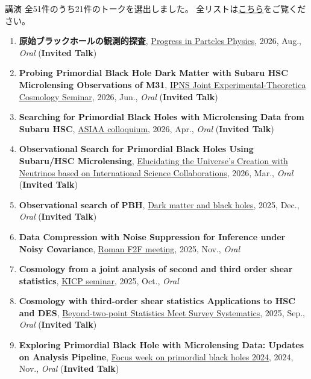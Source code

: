 \begin{rSection}{講演}
全51件のうち21件のトークを選出しました。
全リストは\href{https://github.com/git-sunao/cv/blob/main/ja/sunao_type_list.pdf}{こちら}をご覧ください。\begin{enumerate}[itemsep=0pt, parsep=0pt, topsep=0pt, partopsep=0pt]
\item \textbf{原始ブラックホールの観測的探査}, \href{https://indico.yukawa.kyoto-u.ac.jp/event/95/overview}{Progress in Partcles Physics}, 2026, Aug., \textit{Oral} (\textbf{Invited Talk})
\item \textbf{Probing Primordial Black Hole Dark Matter with Subaru HSC Microlensing Observations of M31}, \href{https://cosmophysics.gitlab.io/jointseminar.gitlab.io/sugiyama20260615.html}{IPNS Joint Experimental-Theoretica Cosmology Seminar}, 2026, Jun., \textit{Oral} (\textbf{Invited Talk})
\item \textbf{Searching for Primordial Black Holes with Microlensing Data from Subaru HSC}, \href{https://www.asiaa.sinica.edu.tw/activity/colloquium.php}{ASIAA colloquium}, 2026, Apr., \textit{Oral} (\textbf{Invited Talk})
\item \textbf{Observational Search for Primordial Black Holes Using Subaru/HSC Microlensing}, \href{https://www-kam2.icrr.u-tokyo.ac.jp/event/19/}{Elucidating the Universe's Creation with Neutrinos based on International Science Collaborations}, 2026, Mar., \textit{Oral} (\textbf{Invited Talk})
\item \textbf{Observational search of PBH}, \href{https://indico.ipmu.jp/event/464/timetable/#20251205}{Dark matter and black holes}, 2025, Dec., \textit{Oral} (\textbf{Invited Talk})
\item \textbf{Data Compression with Noise Suppression 
for Inference under Noisy Covariance}, \href{https://roman-hlis-cosmology.caltech.edu/news/2024-f2f}{Roman F2F meeting}, 2025, Nov., \textit{Oral}
\item \textbf{Cosmology from a joint analysis of second and third order shear statistics}, \href{https://astrophysics.uchicago.edu/events/event/2530/?past=y}{KICP seminar}, 2025, Oct., \textit{Oral}
\item \textbf{Cosmology with third-order shear statistics Applications to HSC and DES}, \href{https://indico.ipmu.jp/event/460/overview}{Beyond-two-point Statistics Meet Survey Systematics}, 2025, Sep., \textit{Oral} (\textbf{Invited Talk})
\item \textbf{Exploring Primordial Black Hole with Microlensing Data: Updates on Analysis Pipeline}, \href{https://indico.ipmu.jp/event/439/overview}{Focus week on primordial black holes 2024}, 2024, Nov., \textit{Oral} (\textbf{Invited Talk})

\end{enumerate}
\end{rSection}
